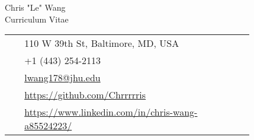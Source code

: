 \documentclass[10pt]{article} %
\begin{document}
\begin{paracol}{2}

\parbox[top][0.12\textheight][c]{\linewidth}{ %
	\vspace{-0.04\textheight} %
	\centering %
	{\sffamily\Huge Chris "Le" Wang}\\\medskip %
	{\Huge\color{headings}\cvtextfont Curriculum Vitae}
}

\switchcolumn %

\parbox[top][0.12\textheight][c]{\linewidth}{ %
	\vspace{-0.04\textheight} %
	\colorbox{shade}{ %
		\begin{supertabular}{p{0.05\linewidth}|p{0.775\linewidth}} %
			\raisebox{-1pt}{\faHome} & 110 W 39th St, Baltimore, MD, USA \\ %
			\raisebox{-1pt}{\faPhone} & +1 (443) 254-2113 \\ %
			\raisebox{0pt}{\small\faEnvelope} & \href{mailto:lwang178@jhu.edu}{lwang178@jhu.edu} \\ %
			\raisebox{-1pt}{\faGithub} & \href{https://github.com/Chrrrrris}{https://github.com/Chrrrrris} \\ %
			\raisebox{-1pt}{\faLinkedinSquare} & \href{https://www.linkedin.com/in/chris-wang-a85524223/}{https://www.linkedin.com/in/chris-wang-a85524223/} \\ %
		\end{supertabular}
	}
}

\end{paracol}
\end{document}

